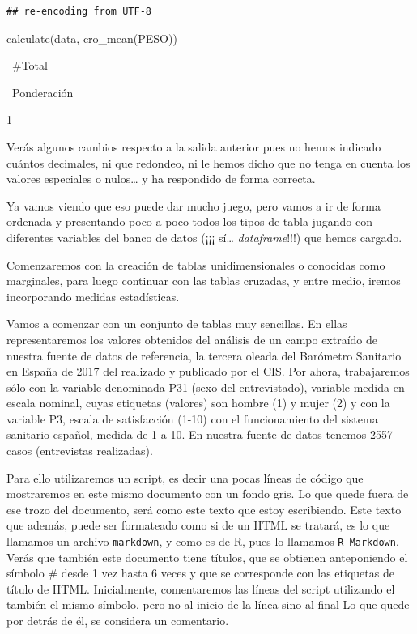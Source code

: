 \documentclass[
]{book}
\newenvironment{Shaded}{\begin{snugshade}}{\end{snugshade}}
\newcommand{\FunctionTok}[1]{\textcolor[rgb]{0.00,0.00,0.00}{#1}}
\newcommand{\NormalTok}[1]{#1}
\begin{document}
\begin{verbatim}
## re-encoding from UTF-8
\end{verbatim}

\begin{Shaded}
\begin{Highlighting}[]
\FunctionTok{calculate}\NormalTok{(data, }\FunctionTok{cro\_mean}\NormalTok{(PESO))}
\end{Highlighting}
\end{Shaded}

~\#Total~

~Ponderación~

1

Verás algunos cambios respecto a la salida anterior pues no hemos indicado cuántos decimales, ni que redondeo, ni le hemos dicho que no tenga en cuenta los valores especiales o nulos\ldots{} y ha respondido de forma correcta.

Ya vamos viendo que eso puede dar mucho juego, pero vamos a ir de forma ordenada y presentando poco a poco todos los tipos de tabla jugando con diferentes variables del banco de datos (¡¡¡ sí\ldots{} \emph{dataframe}!!!) que hemos cargado.

Comenzaremos con la creación de tablas unidimensionales o conocidas como marginales, para luego continuar con las tablas cruzadas, y entre medio, iremos incorporando medidas estadísticas.

Vamos a comenzar con un conjunto de tablas muy sencillas. En ellas representaremos los valores obtenidos del análisis de un campo extraído de nuestra fuente de datos de referencia, la tercera oleada del Barómetro Sanitario en España de 2017 del realizado y publicado por el CIS. Por ahora, trabajaremos sólo con la variable denominada P31 (sexo del entrevistado), variable medida en escala nominal, cuyas etiquetas (valores) son hombre (1) y mujer (2) y con la variable P3, escala de satisfacción (1-10) con el funcionamiento del sistema sanitario español, medida de 1 a 10. En nuestra fuente de datos tenemos 2557 casos (entrevistas realizadas).

Para ello utilizaremos un script, es decir una pocas líneas de código que mostraremos en este mismo documento con un fondo gris. Lo que quede fuera de ese trozo del documento, será como este texto que estoy escribiendo. Este texto que además, puede ser formateado como si de un HTML se tratará, es lo que llamamos un archivo \texttt{markdown}, y como es de R, pues lo llamamos \texttt{R\ Markdown}. Verás que también este documento tiene títulos, que se obtienen anteponiendo el símbolo \# desde 1 vez hasta 6 veces y que se corresponde con las etiquetas de título de HTML. Inicialmente, comentaremos las líneas del script utilizando el también el mismo símbolo, pero no al inicio de la línea sino al final Lo que quede por detrás de él, se considera un comentario.
\end{document}
